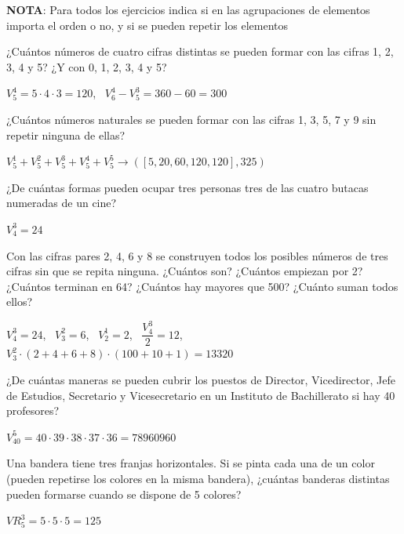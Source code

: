 \documentclass[spanish, 11pt]{exam}
\begin{document}
\textbf{NOTA}: Para todos los ejercicios indica si en las agrupaciones de elementos importa el orden o no, y si se pueden repetir los elementos 
\begin{questions}
\question ¿Cuántos números de cuatro cifras distintas se pueden formar con las cifras 1, 2, 3, 4 y 5? ¿Y con 0, 1, 2, 3, 4 y 5?

\begin{solution}
$V_5^{4}=5\cdot 4\cdot 3 = 120$, \
$V_6^4 - V_5^3 = 360 - 60 = 300$
\end{solution}

\question ¿Cuántos números naturales se pueden formar con las cifras 1, 3, 5, 7 y 9 sin repetir ninguna de ellas?
\begin{solution}
$V_5^1+V_5^2+V_5^3+V_5^4+V_5^5 \to ([5, 20, 60, 120, 120], 325)$
\end{solution}


\question ¿De cuántas formas pueden ocupar tres personas tres de las cuatro butacas numeradas de un cine?

\begin{solution}
$ V_4^3=24$
\end{solution}


\question Con las cifras pares 2, 4, 6 y 8 se construyen todos los posibles números de tres cifras sin que se repita ninguna. ¿Cuántos son? ¿Cuántos empiezan por 2? ¿Cuántos terminan en 64? ¿Cuántos hay mayores que 500? ¿Cuánto suman todos ellos?
\begin{solution}
$V_4^3=24 $, \ 
$V_3^2=6 $,  \ 
$V_2^1=2 $, \ 
$\dfrac{V_4^3}{2}=12 $, \
$V_3^2 \cdot (2 + 4 + 6 + 8) \cdot (100 + 10 +1) =13320$
\end{solution}

\question ¿De cuántas maneras se pueden cubrir los puestos de Director, Vicedirector, Jefe de Estudios, Secretario y Vicesecretario en un Instituto de Bachillerato si hay 40 profesores?

\begin{solution}
$V_{40}^5=40\cdot39\cdot38\cdot37\cdot36=78960960$
\end{solution}

\question Una bandera tiene tres franjas horizontales. Si se pinta cada una de un color (pueden repetirse los colores en la misma bandera), ¿cuántas banderas distintas pueden formarse cuando se dispone de 5 colores?
\begin{solution}
$ {VR}_5^3=5\cdot5\cdot5=125$
\end{solution}


\end{questions}
\end{document}
